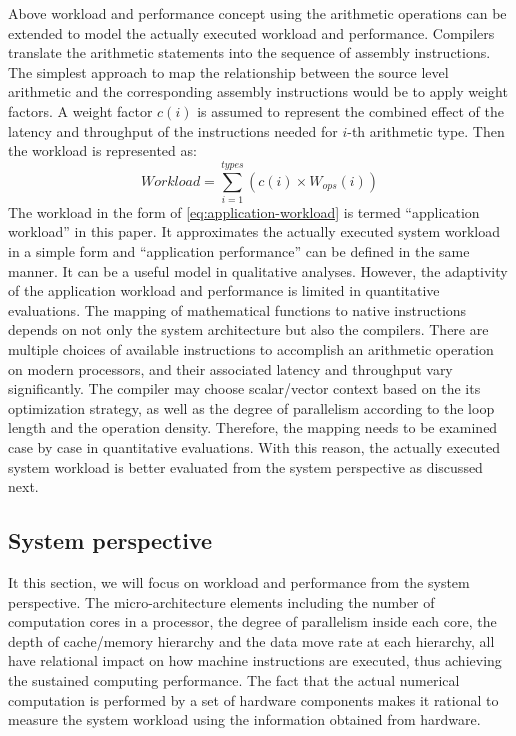 \documentclass[conference]{IEEEtran}
\begin{document}
Above workload and performance concept using the arithmetic operations
can be extended to model the actually executed workload and performance.
Compilers translate the arithmetic statements into the sequence of
assembly instructions.
The simplest approach to map the relationship between
the source level arithmetic and the corresponding assembly instructions
would be to apply weight factors.
A weight factor $ c(i) $ is assumed to represent the combined effect of
the latency and throughput of the instructions needed for $ i $-th
arithmetic type.  Then the workload is represented as:
\begin{equation}\label{eq:application-workload}
		Workload = \sum_{i=1}^{types} \left(c(i)\times W_{ops}(i)\right)
\end{equation}
%
The workload in the form of \eqref{eq:application-workload}
is termed ``application workload'' in this paper.
It approximates the actually executed system workload in a simple form
and ``application performance'' can be defined in the same manner.
It can be a useful model in qualitative analyses.
However, the adaptivity of the application workload and performance is limited
in quantitative evaluations.
The mapping of mathematical functions to native instructions 
depends on not only the system architecture but also the compilers.
There are multiple choices of available instructions to accomplish an
arithmetic operation on modern processors, and their associated latency
and throughput vary significantly.
The compiler may choose scalar/vector context based on
the its optimization strategy, as well as the degree of parallelism
according to the loop length and the operation density.
Therefore, the mapping needs to be examined case by case
in quantitative evaluations.
With this reason, the actually executed system workload is better evaluated
from the system perspective as discussed next.

%
\subsection{System perspective}
\label{subsection:system-perspective}

It this section, we will focus on workload and performance from
the system perspective.
The micro-architecture elements including the number of computation cores
in a processor, the degree of parallelism inside each core,
the depth of cache/memory hierarchy and the data move rate at each hierarchy,
all have relational impact on how machine instructions are executed,
thus achieving the sustained computing performance.
The fact that the actual numerical computation is performed by
a set of hardware components makes it rational to measure
the system workload using the information obtained from hardware.
\end{document}

